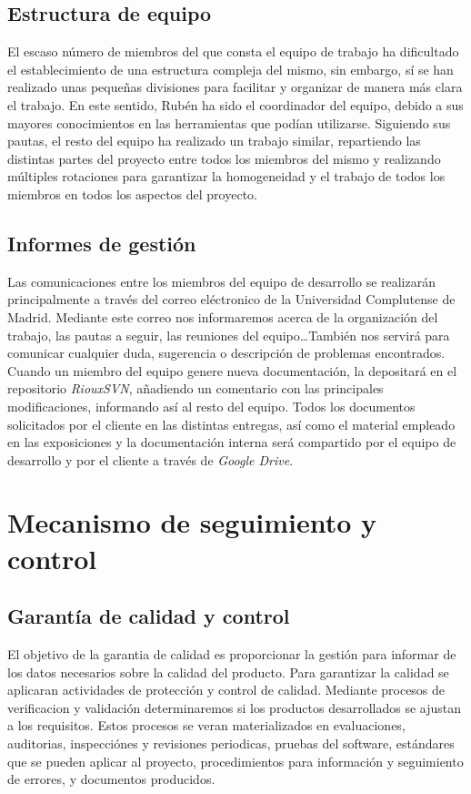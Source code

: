 \documentclass[11pt, a4paper, twoside]{report}
\begin{document}
		\subsection{Estructura de equipo}	%
		El escaso número de miembros del que consta el equipo de trabajo ha dificultado el establecimiento de una estructura compleja del mismo, sin embargo, sí se han realizado unas pequeñas divisiones para facilitar y organizar de manera más clara el trabajo. En este sentido, Rubén ha sido el coordinador del equipo, debido a sus mayores conocimientos en las herramientas que podían utilizarse. Siguiendo sus pautas, el resto del equipo ha realizado un trabajo similar, repartiendo las distintas partes del proyecto entre todos los miembros del mismo y realizando múltiples rotaciones para garantizar la homogeneidad y el trabajo de todos los miembros en todos los aspectos del proyecto.
		\subsection{Informes de gestión}
		Las comunicaciones entre los miembros del equipo de desarrollo se realizarán principalmente a través del correo eléctronico de la Universidad Complutense de Madrid. Mediante este correo nos informaremos acerca de la organización del trabajo, las pautas a seguir, las reuniones del equipo\ldots También nos servirá para comunicar cualquier duda, sugerencia o descripción de problemas encontrados. \\
		Cuando un miembro del equipo genere nueva documentación, la depositará en el repositorio \textit{RiouxSVN}, añadiendo un comentario con las principales modificaciones, informando así al resto del equipo. Todos los documentos solicitados por el cliente en las distintas entregas, así como el material empleado en las exposiciones y la documentación interna será compartido por el equipo de desarrollo y por el cliente a través de  \textit{Google Drive}.
	\section{Mecanismo de seguimiento y control}
		\subsection{Garantía de calidad y control}
		El objetivo de la garantia de calidad es proporcionar la gestión para informar de los datos necesarios sobre la calidad del producto. Para garantizar la calidad se aplicaran actividades de protección y control de calidad. Mediante procesos de verificacion y validación determinaremos si los productos desarrollados se ajustan a los requisitos. Estos procesos se veran materializados en evaluaciones, auditorias, inspecciónes y revisiones periodicas, pruebas del software, estándares que se pueden aplicar al proyecto, procedimientos para información y seguimiento de errores, y documentos producidos.
\end{document}
